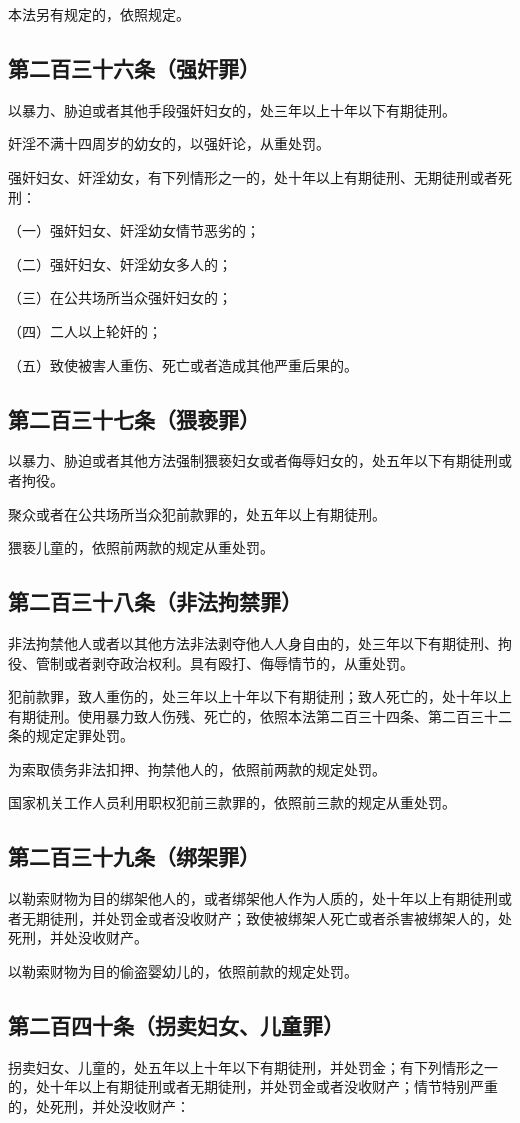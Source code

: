 \documentclass[utf-8,10pt]{ctexart}
\begin{document}
本法另有规定的，依照规定。
\subsection{第二百三十六条（强奸罪）}
以暴力、胁迫或者其他手段强奸妇女的，处三年以上十年以下有期徒刑。

奸淫不满十四周岁的幼女的，以强奸论，从重处罚。

强奸妇女、奸淫幼女，有下列情形之一的，处十年以上有期徒刑、无期徒刑或者死刑：

（一）强奸妇女、奸淫幼女情节恶劣的；

（二）强奸妇女、奸淫幼女多人的；

（三）在公共场所当众强奸妇女的；

（四）二人以上轮奸的；

（五）致使被害人重伤、死亡或者造成其他严重后果的。
\subsection{第二百三十七条（猥亵罪）}
以暴力、胁迫或者其他方法强制猥亵妇女或者侮辱妇女的，处五年以下有期徒刑或者拘役。

聚众或者在公共场所当众犯前款罪的，处五年以上有期徒刑。

猥亵儿童的，依照前两款的规定从重处罚。
\subsection{第二百三十八条（非法拘禁罪）}
非法拘禁他人或者以其他方法非法剥夺他人人身自由的，处三年以下有期徒刑、拘役、管制或者剥夺政治权利。具有殴打、侮辱情节的，从重处罚。

犯前款罪，致人重伤的，处三年以上十年以下有期徒刑；致人死亡的，处十年以上有期徒刑。使用暴力致人伤残、死亡的，依照本法第二百三十四条、第二百三十二条的规定定罪处罚。

为索取债务非法扣押、拘禁他人的，依照前两款的规定处罚。

国家机关工作人员利用职权犯前三款罪的，依照前三款的规定从重处罚。
\subsection{第二百三十九条（绑架罪）}
以勒索财物为目的绑架他人的，或者绑架他人作为人质的，处十年以上有期徒刑或者无期徒刑，并处罚金或者没收财产；致使被绑架人死亡或者杀害被绑架人的，处死刑，并处没收财产。

以勒索财物为目的偷盗婴幼儿的，依照前款的规定处罚。
\subsection{第二百四十条（拐卖妇女、儿童罪）}
拐卖妇女、儿童的，处五年以上十年以下有期徒刑，并处罚金；有下列情形之一的，处十年以上有期徒刑或者无期徒刑，并处罚金或者没收财产；情节特别严重的，处死刑，并处没收财产：
\end{document}

